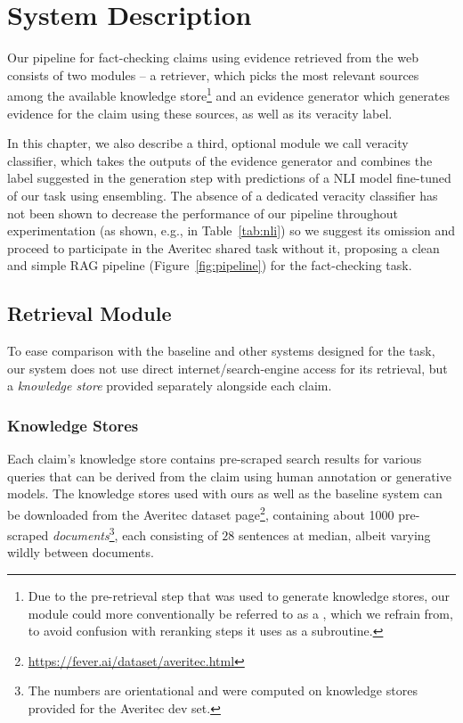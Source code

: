 
\section{System Description}
\label{sec:system}
Our pipeline for fact-checking claims using evidence retrieved from the web consists of two modules -- a retriever, which picks the most relevant sources among the available knowledge store\footnote{Due to the pre-retrieval step that was used to generate knowledge stores, our  module could more conventionally be referred to as a , which we refrain from, to avoid confusion with reranking steps it uses as a subroutine.} and an evidence generator which generates evidence for the claim using these sources, as well as its veracity label. 

In this chapter, we also describe a third, optional module we call veracity classifier, which takes the outputs of the evidence generator and combines the label suggested in the generation step with predictions of a NLI model fine-tuned of our task using ensembling.
The absence of a dedicated veracity classifier has not been shown to decrease the performance of our pipeline throughout experimentation (as shown, e.g., in Table~\ref{tab:nli}) so we suggest its omission and proceed to participate in the Averitec shared task without it, proposing a clean and simple RAG pipeline (Figure~\ref{fig:pipeline}) for the fact-checking task.

\subsection{Retrieval Module}
To ease comparison with the baseline and other systems designed for the task, our system does not use direct internet/search-engine access for its retrieval, but a \textit{knowledge store} provided separately alongside each claim.


\subsubsection{Knowledge Stores}
Each claim's knowledge store contains pre-scraped search results for various queries that can be derived from the claim using human annotation or generative models.
The knowledge stores used with ours as well as the baseline system can be downloaded from the Averitec dataset page\footnote{\url{https://fever.ai/dataset/averitec.html}}, containing about 1000 pre-scraped \textit{documents}\footnote{\label{devsetnote} The numbers are orientational and were computed on knowledge stores provided for the Averitec dev set.}, each consisting of $28$ sentences at median, albeit varying wildly between documents.

